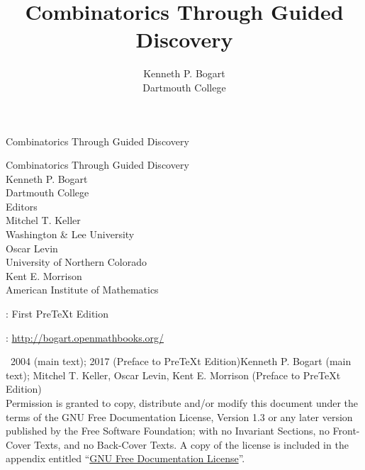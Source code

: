 \documentclass[10pt,]{book}
\title{Combinatorics Through Guided Discovery}
\author{Kenneth P. Bogart\\
Dartmouth College
}
\date{}
\theoremstyle{plain}
\theoremstyle{definition}
\theoremstyle{definition}
\numberwithin{equation}{chapter}
\begin{document}

\frontmatter
\thispagestyle{empty}
{\centering
\vspace*{0.28\textheight}
{\Huge Combinatorics Through Guided Discovery}\\}
\clearpage
\thispagestyle{empty}
\null%
\clearpage
\thispagestyle{empty}
{\centering
\vspace*{0.14\textheight}
{\Huge Combinatorics Through Guided Discovery}\\[3\baselineskip]
{\Large Kenneth P. Bogart}\\[0.5\baselineskip]
{\Large Dartmouth College}\\[3\baselineskip]
{\Large Editors}\\[0.5\baselineskip]
{\normalsize Mitchel T. Keller}\\[0.25\baselineskip]
Washington \& Lee University\\[0.5\baselineskip]

{\normalsize Oscar Levin}\\[0.25\baselineskip]
University of Northern Colorado\\[0.5\baselineskip]

{\normalsize Kent E. Morrison}\\[0.25\baselineskip]
American Institute of Mathematics\\
}
\clearpage
\thispagestyle{empty}
\hypertarget{colophon-1}{}
: First PreTeXt Edition\par\medskip
{}: \href{http://bogart.openmathbooks.org/}{http://bogart.openmathbooks.org/}\par\medskip
\noindent\textcopyright\ 2004 (main text); 2017 (Preface to PreTeXt Edition)\quad{}Kenneth P. Bogart (main text); Mitchel T. Keller, Oscar Levin, Kent E. Morrison (Preface to PreTeXt Edition)\\[0.5\baselineskip]
Permission is granted to copy, distribute and/or modify this document under the terms of the GNU Free Documentation License, Version 1.3 or any later version published by the Free Software Foundation; with no Invariant Sections, no Front-Cover Texts, and no Back-Cover Texts.  A copy of the license is included in the appendix entitled ``\hyperref[appendix-gfdl]{GNU Free Documentation License}''.\par\medskip
{}
\null\clearpage
\end{document}
